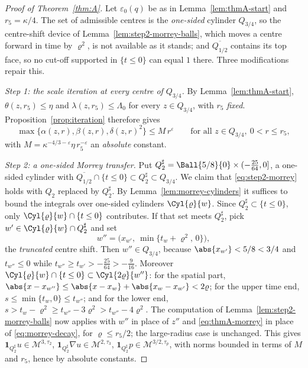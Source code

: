 \documentclass[11pt,reqno]{amsart}
\begin{document}
\begin{proof}[Proof of Theorem~\ref{thm:A}]
Let $\varepsilon_{0}(q)$ be as in Lemma~\ref{lem:thmA-start} and
$r_{5}=\kappa/4$. The set of admissible centres is the \emph{one-sided}
cylinder $Q_{3/4}$, so the centre-shift device of
Lemma~\ref{lem:step2-morrey-balls}, which moves a centre forward in time by
$\varrho^{2}$, is not available as it stands; and $\overline{Q_{1/2}}$ contains
its top face, so no cut-off supported in $\{t\le0\}$ can equal $1$ there. Three
modifications repair this.

\emph{Step 1: the scale iteration at every centre of $Q_{3/4}$.} By
Lemma~\ref{lem:thmA-start}, $\theta(z,r_{5})\le\eta$ and
$\lambda(z,r_{5})\le\Lambda_{0}$ for every $z\in Q_{3/4}$, with $r_{5}$
\emph{fixed}. Proposition~\ref{prop:iteration} therefore gives
\begin{equation}\label{eq:thmA-morrey}
  \max\bigl\{\alpha(z,r),\beta(z,r),\delta(z,r)^{2}\bigr\}\le M\,r^{\varepsilon}
  \qquad\text{for all }z\in Q_{3/4},\ 0<r\le r_{5},
\end{equation}
with $M=\kappa^{-4/3-\varepsilon}\eta\,r_{5}^{-\varepsilon}$ an \emph{absolute}
constant.

\emph{Step 2: a one-sided Morrey transfer.} Put
$Q_{2}^{\sharp}=\Ball{5/8}{0}\times(-\tfrac{25}{64},0]$, a one-sided cylinder
with $\overline{Q_{1/2}}\cap\{t\le0\}\subset Q_{2}^{\sharp}\subset Q_{3/4}$. We
claim that \eqref{eq:step2-morrey} holds with $Q_{2}$ replaced by
$Q_{2}^{\sharp}$. By Lemma~\ref{lem:morrey-cylinders} it suffices to bound the
integrals over one-sided cylinders $\Cyl{\varrho}{w}$. Since
$Q_{2}^{\sharp}\subset\{t\le0\}$, only $\Cyl{\varrho}{w}\cap\{t\le0\}$
contributes. If that set meets $Q_{2}^{\sharp}$, pick
$w'\in\Cyl{\varrho}{w}\cap Q_{2}^{\sharp}$ and set
\[
  w''=\bigl(x_{w'},\ \min\{t_{w}+\varrho^{2},\,0\}\bigr),
\]
the \emph{truncated} centre shift. Then $w''\in Q_{3/4}$, because
$\abs{x_{w'}}<5/8<3/4$ and $t_{w''}\le0$ while
$t_{w''}\ge t_{w'}>-\tfrac{25}{64}>-\tfrac9{16}$. Moreover
$\Cyl{\varrho}{w}\cap\{t\le0\}\subset\Cyl{2\varrho}{w''}$: for the spatial part,
$\abs{x-x_{w''}}\le\abs{x-x_{w}}+\abs{x_{w}-x_{w'}}<2\varrho$; for the upper
time end, $s\le\min\{t_{w},0\}\le t_{w''}$; and for the lower end,
$s>t_{w}-\varrho^{2}\ge t_{w''}-3\varrho^{2}>t_{w''}-4\varrho^{2}$. The
computation of Lemma~\ref{lem:step2-morrey-balls} now applies with $w''$ in
place of $z''$ and \eqref{eq:thmA-morrey} in place of
\eqref{eq:morrey-decay}, for $\varrho\le r_{5}/2$; the large-radius case is
unchanged. This gives
$\mathbf{1}_{Q_{2}^{\sharp}}u\in\mathcal{M}^{3,\tau_{2}}$,
$\mathbf{1}_{Q_{2}^{\sharp}}\nabla u\in\mathcal{M}^{2,\tau_{3}}$,
$\mathbf{1}_{Q_{2}^{\sharp}}p\in\mathcal{M}^{3/2,\tau_{p}}$, with norms bounded
in terms of $M$ and $r_{5}$, hence by absolute constants.


\end{proof}
\end{document}
